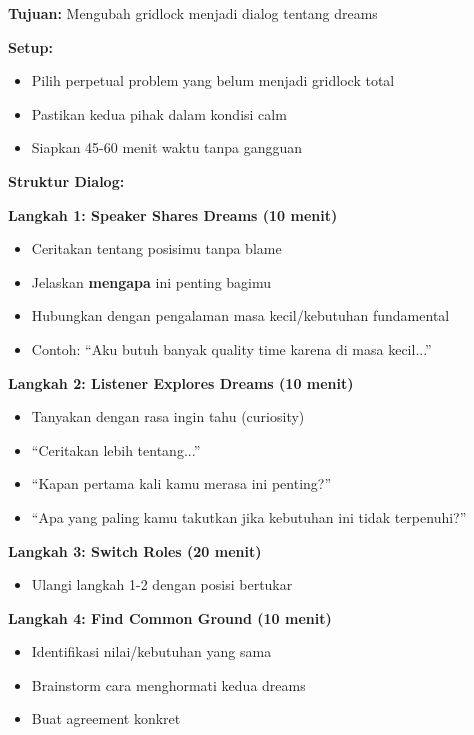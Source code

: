 \begin{exercisebox}
\textbf{Tujuan:} Mengubah gridlock menjadi dialog tentang dreams

\textbf{Setup:}
\begin{itemize}
    \item Pilih perpetual problem yang belum menjadi gridlock total
    \item Pastikan kedua pihak dalam kondisi calm
    \item Siapkan 45-60 menit waktu tanpa gangguan
\end{itemize}

\textbf{Struktur Dialog:}

\textbf{Langkah 1: Speaker Shares Dreams (10 menit)}
\begin{itemize}
    \item Ceritakan tentang posisimu tanpa blame
    \item Jelaskan \textbf{mengapa} ini penting bagimu
    \item Hubungkan dengan pengalaman masa kecil/kebutuhan fundamental
    \item Contoh: ``Aku butuh banyak quality time karena di masa kecil...''
\end{itemize}

\textbf{Langkah 2: Listener Explores Dreams (10 menit)}
\begin{itemize}
    \item Tanyakan dengan rasa ingin tahu (curiosity)
    \item ``Ceritakan lebih tentang...''
    \item ``Kapan pertama kali kamu merasa ini penting?''
    \item ``Apa yang paling kamu takutkan jika kebutuhan ini tidak terpenuhi?''
\end{itemize}

\textbf{Langkah 3: Switch Roles (20 menit)}
\begin{itemize}
    \item Ulangi langkah 1-2 dengan posisi bertukar
\end{itemize}

\textbf{Langkah 4: Find Common Ground (10 menit)}
\begin{itemize}
    \item Identifikasi nilai/kebutuhan yang sama
    \item Brainstorm cara menghormati kedua dreams
    \item Buat agreement konkret
\end{itemize}
\end{exercisebox}

